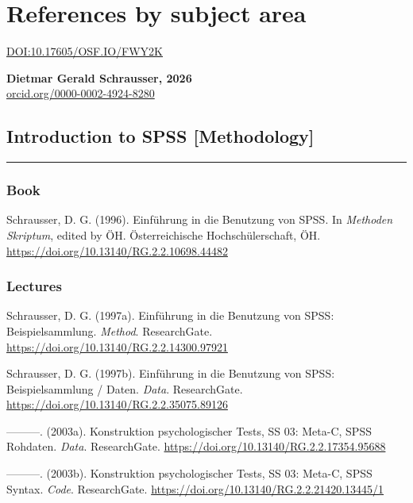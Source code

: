 \documentclass[
]{article}
\author{Dietmar Gerald SCHRAUSSER}
\date{13.04.2026}
\begin{document}
\hypertarget{references-by-subject-area}{%
\section{References by subject area}\label{references-by-subject-area}}

\href{https://doi.org/10.17605/OSF.IO/FWY2K}{DOI:10.17605/OSF.IO/FWY2K}

\textbf{Dietmar Gerald Schrausser, 2026}\\
\href{https://orcid.org/0000-0002-4924-8280}{orcid.org/0000-0002-4924-8280}

\hypertarget{introduction-to-spss-methodology}{%
\subsection{Introduction to SPSS
{[}Methodology{]}}\label{introduction-to-spss-methodology}}

\begin{center}\rule{0.5\linewidth}{0.5pt}\end{center}

\hypertarget{book}{%
\subsubsection{Book}\label{book}}

Schrausser, D. G. (1996). Einführung in die Benutzung von SPSS. In
\emph{Methoden Skriptum}, edited by ÖH. Österreichische
Hochschülerschaft, ÖH. \url{https://doi.org/10.13140/RG.2.2.10698.44482}

\hypertarget{lectures}{%
\subsubsection{Lectures}\label{lectures}}

Schrausser, D. G. (1997a). Einführung in die Benutzung von SPSS:
Beispielsammlung. \emph{Method}. ResearchGate.
\url{https://doi.org/10.13140/RG.2.2.14300.97921}

Schrausser, D. G. (1997b). Einführung in die Benutzung von SPSS:
Beispielsammlung / Daten. \emph{Data}. ResearchGate.
\url{https://doi.org/10.13140/RG.2.2.35075.89126}

---------. (2003a). Konstruktion psychologischer Tests, SS 03: Meta-C,
SPSS Rohdaten. \emph{Data}. ResearchGate.
\url{https://doi.org/10.13140/RG.2.2.17354.95688}

---------. (2003b). Konstruktion psychologischer Tests, SS 03: Meta-C,
SPSS Syntax. \emph{Code}. ResearchGate.
\url{https://doi.org/10.13140/RG.2.2.21420.13445/1}
\end{document}

